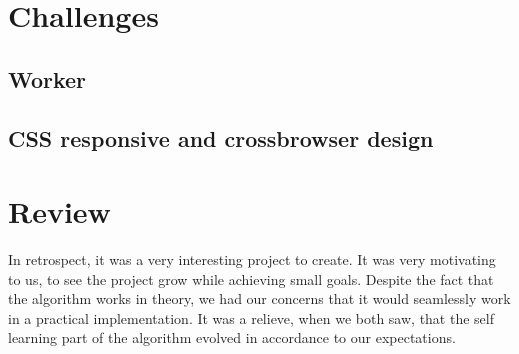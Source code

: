 \section{Challenges}
\subsection{Worker}
\subsection{CSS responsive and crossbrowser design}

\section{Review}
In retrospect, it was a very interesting project to create. It was very motivating to us, to see the project grow while achieving small goals. Despite the fact that the algorithm works in theory, we had our concerns that it would seamlessly work in a practical implementation. It was a relieve, when we both saw, that the self learning part of the algorithm evolved in accordance to our expectations.
